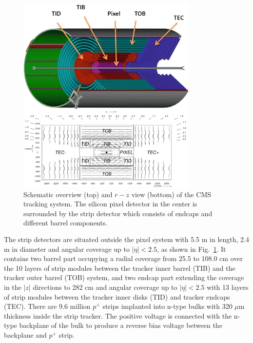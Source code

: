 \begin{figure}[H]\centering
    \includegraphics[width=0.8\textwidth]{figure/cms_tracker.png}
    \caption[Schematic overview and $r-z$ view (bottom) of the CMS tracking system.]{
        Schematic overview (top) and $r-z$ view (bottom) of the CMS tracking system.
        The silicon pixel detector in the center is surrounded by the strip detector which consists of endcaps and different barrel components.
    }
    \label{fig:cms_tracker}
\end{figure}
The strip detectors are situated outside the pixel system with 5.5 m in length, 2.4 m in diameter and angular coverage up to $|\eta|<2.5$, as shown in Fig.~\ref{fig:cms_tracker}.
It contains two barrel part occupying a radial coverage from 25.5 to 108.0 cm over the 10 layers of strip modules between the tracker inner barrel (TIB) and the tracker outer barrel (TOB) system, and two endcap part extending the coverage in the $|z|$ directions to 282 cm and angular coverage up to $|\eta|<2.5$ with 13 layers of strip modules between the tracker inner disks (TID) and tracker endcaps (TEC).
There are 9.6 million $p^+$ strips implanted into n-type bulks with 320 $\mu$m thickness inside the strip tracker.
The positive voltage is connected with the n-type backplane of the bulk to produce a reverse bias voltage between the backplane and $p^+$ strip.

